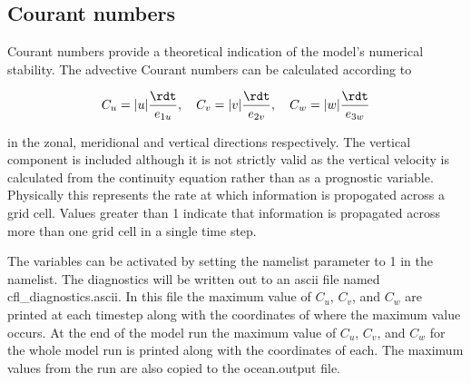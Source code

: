 \documentclass[../main/NEMO_manual]{subfiles}
\begin{document}
\subsection{Courant numbers}

Courant numbers provide a theoretical indication of the model's numerical stability.
The advective Courant numbers can be calculated according to

\[
  C_u = |u|\frac{\rdt}{e_{1u}}, \quad C_v = |v|\frac{\rdt}{e_{2v}}, \quad C_w = |w|\frac{\rdt}{e_{3w}}
\]

in the zonal, meridional and vertical directions respectively.
The vertical component is included although it is not strictly valid as the vertical velocity is calculated from
the continuity equation rather than as a prognostic variable.
Physically this represents the rate at which information is propogated across a grid cell.
Values greater than 1 indicate that information is propagated across more than one grid cell in a single time step.

The variables can be activated by setting the  namelist parameter to 1 in the  namelist.
The diagnostics will be written out to an ascii file named cfl\_diagnostics.ascii.
In this file the maximum value of $C_u$, $C_v$, and $C_w$ are printed at each timestep along with the coordinates of
where the maximum value occurs.
At the end of the model run the maximum value of $C_u$, $C_v$, and $C_w$ for the whole model run is printed along
with the coordinates of each.
The maximum values from the run are also copied to the ocean.output file.

\subinc{}
\end{document}
